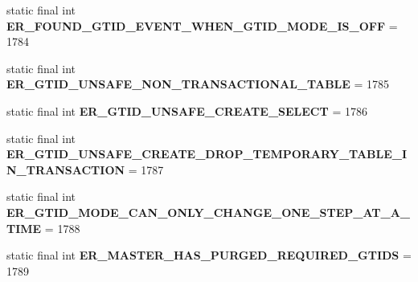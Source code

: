 \begin{DoxyCompactItemize}
\item 
\mbox{\label{classcom_1_1mysql_1_1cj_1_1exceptions_1_1_mysql_error_numbers_a91ea047db79fa3b052757104e3b96312}} 
static final int {\bfseries E\+R\+\_\+\+F\+O\+U\+N\+D\+\_\+\+G\+T\+I\+D\+\_\+\+E\+V\+E\+N\+T\+\_\+\+W\+H\+E\+N\+\_\+\+G\+T\+I\+D\+\_\+\+M\+O\+D\+E\+\_\+\+I\+S\+\_\+\+O\+FF} = 1784
\item 
\mbox{\label{classcom_1_1mysql_1_1cj_1_1exceptions_1_1_mysql_error_numbers_a78f0d5ff699757c46a02d8a504ae7c9d}} 
static final int {\bfseries E\+R\+\_\+\+G\+T\+I\+D\+\_\+\+U\+N\+S\+A\+F\+E\+\_\+\+N\+O\+N\+\_\+\+T\+R\+A\+N\+S\+A\+C\+T\+I\+O\+N\+A\+L\+\_\+\+T\+A\+B\+LE} = 1785
\item 
\mbox{\label{classcom_1_1mysql_1_1cj_1_1exceptions_1_1_mysql_error_numbers_a01d8e37b0bc9a3d1697496a20d3488a9}} 
static final int {\bfseries E\+R\+\_\+\+G\+T\+I\+D\+\_\+\+U\+N\+S\+A\+F\+E\+\_\+\+C\+R\+E\+A\+T\+E\+\_\+\+S\+E\+L\+E\+CT} = 1786
\item 
\mbox{\label{classcom_1_1mysql_1_1cj_1_1exceptions_1_1_mysql_error_numbers_a854541464f472bcccc3b2a577cf8b8dc}} 
static final int {\bfseries E\+R\+\_\+\+G\+T\+I\+D\+\_\+\+U\+N\+S\+A\+F\+E\+\_\+\+C\+R\+E\+A\+T\+E\+\_\+\+D\+R\+O\+P\+\_\+\+T\+E\+M\+P\+O\+R\+A\+R\+Y\+\_\+\+T\+A\+B\+L\+E\+\_\+\+I\+N\+\_\+\+T\+R\+A\+N\+S\+A\+C\+T\+I\+ON} = 1787
\item 
\mbox{\label{classcom_1_1mysql_1_1cj_1_1exceptions_1_1_mysql_error_numbers_a885e7c2d907e214664f4b583487d9700}} 
static final int {\bfseries E\+R\+\_\+\+G\+T\+I\+D\+\_\+\+M\+O\+D\+E\+\_\+\+C\+A\+N\+\_\+\+O\+N\+L\+Y\+\_\+\+C\+H\+A\+N\+G\+E\+\_\+\+O\+N\+E\+\_\+\+S\+T\+E\+P\+\_\+\+A\+T\+\_\+\+A\+\_\+\+T\+I\+ME} = 1788
\item 
\mbox{\label{classcom_1_1mysql_1_1cj_1_1exceptions_1_1_mysql_error_numbers_ad0738e7ca271aece8de6c461cafae4af}} 
static final int {\bfseries E\+R\+\_\+\+M\+A\+S\+T\+E\+R\+\_\+\+H\+A\+S\+\_\+\+P\+U\+R\+G\+E\+D\+\_\+\+R\+E\+Q\+U\+I\+R\+E\+D\+\_\+\+G\+T\+I\+DS} = 1789

\end{DoxyCompactItemize}
